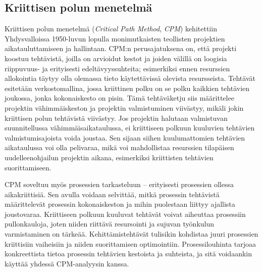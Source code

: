\documentclass[
  finnish,
  letterpaper,
  DIV=11,
  numbers=noendperiod,
  oneside]{scrreprt}
\begin{document}
\subsection{Kriittisen polun
menetelmä}\label{kriittisen-polun-menetelmuxe4}

Kriittisen polun menetelmä (\emph{Critical Path Method}, \emph{CPM})
kehitettiin Yhdysvalloissa 1950-luvun lopulla monimutkaisten teollisten
projektien aikatauluttamiseen ja hallintaan. CPM:n perusajatuksena on,
että projekti koostuu tehtävistä, joilla on arvioidut kestot ja joiden
välillä on loogisia riippuvuus- ja erityisesti edeltävyyssuhteita;
esimerkiksi ennen resurssien allokointia täytyy olla olemassa tieto
käytettävissä olevista resursseista. Tehtävät esitetään verkostomallina,
jossa kriittinen polku on se polku kaikkien tehtävien joukossa, jonka
kokonaiskesto on pisin. Tämä tehtäväketju siis määrittelee projektin
vähimmäiskeston ja projektin valmistuminen viivästyy, mikäli jokin
kriittisen polun tehtävistä viivästyy. Jos projektin halutaan
valmistuvan suunnitellussa vähimmäisaikataulussa, ei kriittiseen polkuun
kuuluvien tehtävien valmistumisajoista voida joustaa. Sen sijaan siihen
kuulumattomien tehtävien aikataulussa voi olla pelivaraa, mikä voi
mahdollistaa resurssien tilapäisen uudelleenohjailun projektin aikana,
esimerkiksi kriittisten tehtävien suorittamiseen.

CPM soveltuu myös prosessien tarkasteluun -- erityisesti prosessien
ollessa aikakriittisiä. Sen avulla voidaan selvittää, mitkä prosessin
tehtävistä määrittelevät prosessin kokonaiskeston ja mihin puolestaan
liittyy ajallista joustovaraa. Kriittiseen polkuun kuuluvat tehtävät
voivat aiheuttaa prosessiin pullonkauloja, joten niiden riittävä
resursointi ja sujuvan työnkulun varmistaminen on tärkeää.
Kehittämistehtävät tulisikin kohdistaa juuri prosessien kriittisiin
vaiheisiin ja niiden suorittamisen optimointiin. Prosessilouhinta
tarjoaa konkreettista tietoa prosessin tehtävien kestoista ja suhteista,
ja sitä voidaankin käyttää yhdessä CPM-analyysin kanssa.
\end{document}

